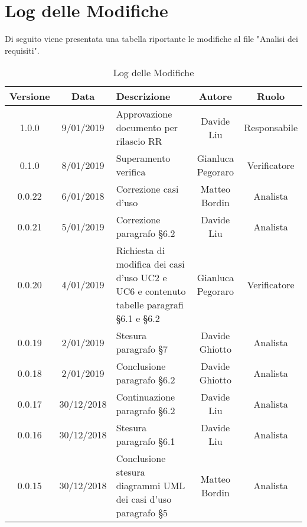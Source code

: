 	\section{Log delle Modifiche}
Di seguito viene presentata una tabella riportante le modifiche al file "Analisi dei requisiti".

\begin{table}[!h] %
            \centering
            \renewcommand{\arraystretch}{2}
            \begin{tabular}{|c|c|p{5cm}|c|c|} %
                \rowcolor{orange!50} %
        		\hline
        		\textbf{Versione} & \textbf{Data} & \textbf{Descrizione} & \textbf{Autore} & \textbf{Ruolo} \\
                \hline
                1.0.0 & 9/01/2019 & Approvazione documento per rilascio RR & Davide Liu & Responsabile \\
                \hline
                0.1.0 & 8/01/2019 & Superamento verifica & Gianluca Pegoraro & Verificatore \\
                \hline
                0.0.22 & 6/01/2018 & Correzione casi d’uso & Matteo Bordin & Analista \\
                \hline
                0.0.21 & 5/01/2019 & Correzione paragrafo §6.2 & Davide Liu & Analista \\
                \hline
                0.0.20 & 4/01/2019 & Richiesta di modifica dei casi d’uso UC2 e UC6 e contenuto tabelle paragrafi §6.1 e §6.2 & Gianluca Pegoraro & Verificatore \\
                \hline
                0.0.19 & 2/01/2019 & Stesura paragrafo §7 & Davide Ghiotto & Analista \\
                \hline
                0.0.18 & 2/01/2019 & Conclusione paragrafo §6.2 & Davide Ghiotto & Analista \\
                \hline
                0.0.17 & 30/12/2018 & Continuazione paragrafo §6.2 & Davide Liu & Analista \\
                \hline
                0.0.16 & 30/12/2018 & Stesura paragrafo §6.1 & Davide Liu & Analista \\
                \hline
                0.0.15 & 30/12/2018 & Conclusione stesura diagrammi UML dei casi d’uso paragrafo §5 & Matteo Bordin & Analista \\
                \hline
                
        \end{tabular}
        \caption{Log delle Modifiche} %
        \label{tab:Log delle modifiche}
\end{table}

